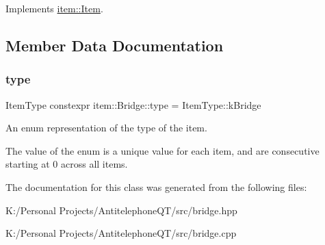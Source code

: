 Implements \hyperlink{classitem_1_1_item_afef6bdd5c1c734c67122e4118e9e1930}{item\+::\+Item}.



\subsection{Member Data Documentation}
\mbox{\label{classitem_1_1_bridge_aeb376b4b999ec6144454cd806e5e06d2}} 
\subsubsection{\texorpdfstring{type}{type}}
{\footnotesize\ttfamily Item\+Type constexpr item\+::\+Bridge\+::type = Item\+Type\+::k\+Bridge\hspace{0.3cm}{\ttfamily [static]}}



An enum representation of the type of the item. 

The value of the enum is a unique value for each item, and are consecutive starting at 0 across all items. 

The documentation for this class was generated from the following files\+:\begin{DoxyCompactItemize}
\item 
K\+:/\+Personal Projects/\+Antitelephone\+Q\+T/src/bridge.\+hpp\item 
K\+:/\+Personal Projects/\+Antitelephone\+Q\+T/src/bridge.\+cpp\end{DoxyCompactItemize}
